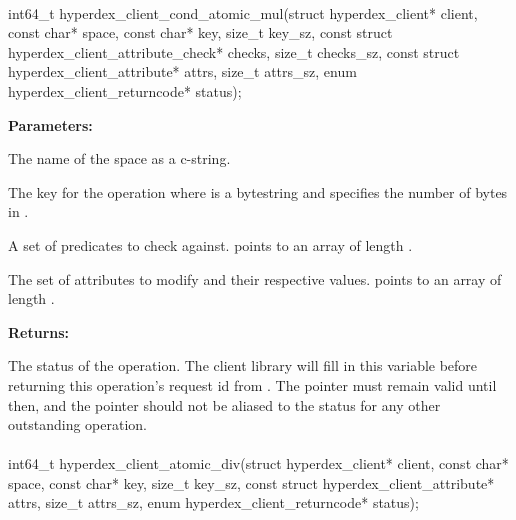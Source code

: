 \paragraph{}
\begin{ccode}
int64_t hyperdex_client_cond_atomic_mul(struct hyperdex_client* client,
                const char* space,
                const char* key, size_t key_sz,
                const struct hyperdex_client_attribute_check* checks, size_t checks_sz,
                const struct hyperdex_client_attribute* attrs, size_t attrs_sz,
                enum hyperdex_client_returncode* status);
\end{ccode}
\funcdesc 

\noindent\textbf{Parameters:}
\begin{description}[labelindent=\widthof{{\code{checks}, \code{checks\_sz}}},leftmargin=*,noitemsep,nolistsep,align=right]
\item[\code{space}] The name of the space as a c-string.
\item[\code{key}, \code{key\_sz}] The key for the operation where  is a bytestring and  specifies the number of bytes in .
\item[\code{checks}, \code{checks\_sz}] A set of predicates to check against.   points to an array of length .
\item[\code{attrs}, \code{attrs\_sz}] The set of attributes to modify and their respective values.   points to an array of length .
\end{description}

\noindent\textbf{Returns:}
\begin{description}[labelindent=\widthof{{\code{status}}},leftmargin=*,noitemsep,nolistsep,align=right]
\item[\code{status}] The status of the operation.  The client library will fill in this variable before returning this operation's request id from .  The pointer must remain valid until then, and the pointer should not be aliased to the status for any other outstanding operation.
\end{description}

\paragraph{}
\begin{ccode}
int64_t hyperdex_client_atomic_div(struct hyperdex_client* client,
                const char* space,
                const char* key, size_t key_sz,
                const struct hyperdex_client_attribute* attrs, size_t attrs_sz,
                enum hyperdex_client_returncode* status);
\end{ccode}
\funcdesc 

